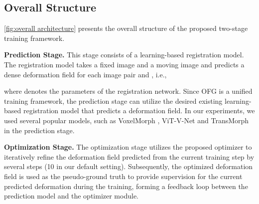 \documentclass[10pt,twocolumn,letterpaper]{article}
\begin{document}
\subsection{Overall Structure}\label{sec:optron architecture}

\cref{fig:overall architecture} presents the overall structure of the proposed two-stage training framework. 

\textbf{Prediction Stage.} This stage consists of a learning-based registration model. The registration model takes a fixed image  and a moving image  and predicts a dense deformation field  for each image pair  and , i.e.,

where  denotes the parameters of the registration network. 
Since OFG is a unified training framework, the prediction stage can utilize the desired existing learning-based registration model that predicts a deformation field. In our experiments, we used several popular models, such as VoxelMorph \cite{Balakrishnan_2019}, ViT-V-Net \cite{chen2021vitvnet} and TransMorph \cite{Chen_2022} in the prediction stage.


\textbf{Optimization Stage.} The optimization stage utilizes the proposed optimizer to iteratively refine the deformation field  predicted from the current training step by several steps (10 in our default setting). Subsequently, the optimized deformation field  is used as the pseudo-ground truth to provide supervision for the current predicted deformation during the training, forming a feedback loop between the prediction model and the optimizer module. 
\end{document}
